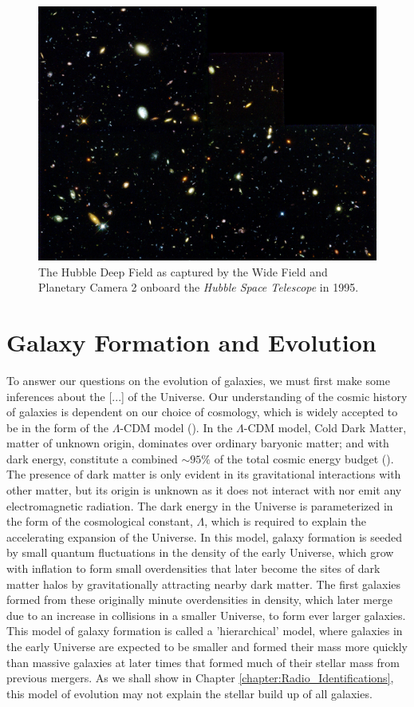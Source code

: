 \begin{figure}
    \centering
	\includegraphics[width=0.9\columnwidth]{Figures/hubble_deep_field.jpeg}
	\caption{The Hubble Deep Field as captured by the Wide Field and Planetary Camera 2 onboard the \textit{Hubble Space Telescope} in 1995.}
	\label{fig:hubble_deep_field}
\end{figure}

\section{Galaxy Formation and Evolution}

To answer our questions on the evolution of galaxies, we must first make some inferences about the {\color{red}[...]} of the Universe. Our understanding of the cosmic history of galaxies is dependent on our choice of cosmology, which is widely accepted to be in the form of the $\Lambda$-CDM model (\citealt{Peebles_1980}). In the $\Lambda$-CDM model, Cold Dark Matter, matter of unknown origin, dominates over ordinary baryonic matter; and with dark energy, constitute a combined $\sim 95\%$ of the total cosmic energy budget (\citealt{Fukugita_2004}). The presence of dark matter is only evident in its gravitational interactions with other matter, but its origin is unknown as it does not interact with nor emit any electromagnetic radiation. The dark energy in the Universe is parameterized in the form of the cosmological constant, $\Lambda$, which is required to explain the accelerating expansion of the Universe. In this model, galaxy formation is seeded by small quantum fluctuations in the density of the early Universe, which grow with inflation to form small overdensities that later become the sites of dark matter halos by gravitationally attracting nearby dark matter. The first galaxies formed from these originally minute overdensities in density, which later merge due to an increase in collisions in a smaller Universe, to form ever larger galaxies. This model of galaxy formation is called a 'hierarchical' model, where galaxies in the early Universe are expected to be smaller and formed their mass more quickly than massive galaxies at later times that formed much of their stellar mass from previous mergers. As we shall show in Chapter \ref{chapter:Radio_Identifications}, this model of evolution may not explain the stellar build up of all galaxies.

